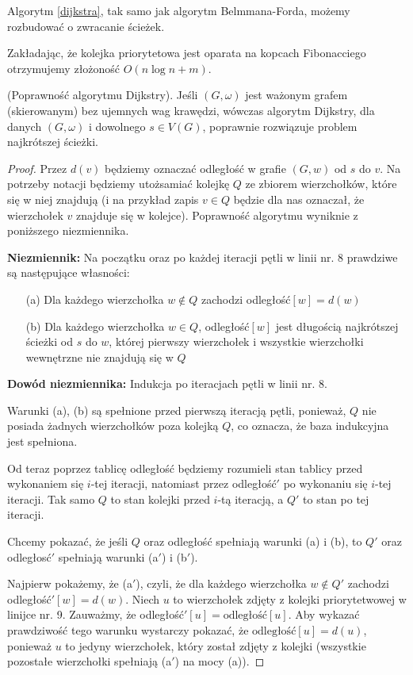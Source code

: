Algorytm \ref{dijkstra}, tak samo jak algorytm Belmmana-Forda,
możemy rozbudować o zwracanie ścieżek.

Zakładając, że kolejka priorytetowa jest oparata na kopcach 
Fibonacciego otrzymujemy złożoność $O(n\log n + m)$. 

\begin{theorem}{(Poprawność algorytmu Dijkstry).}
	Jeśli $(G, \omega)$ jest ważonym grafem (skierowanym)
	bez ujemnych wag krawędzi, wówczas algorytm Dijkstry,
	dla danych $(G, \omega)$ i dowolnego $s \in V(G)$, 
	poprawnie rozwiązuje problem najkrótszej ścieżki.
	
	\begin{proof}
		Przez $d(v)$ będziemy oznaczać odległość w 
		grafie $(G, w)$
		od $s$ do $v$. Na potrzeby notacji 
		będziemy utożsamiać
		kolejkę $Q$ ze zbiorem wierzchołków, które
		się w niej znajdują (i na przykład zapis $v \in Q$ 
		będzie dla nas oznaczał, że
		wierzchołek $v$ znajduje się w kolejce).
		Poprawność algorytmu wyniknie z poniższego niezmiennika.
		
		\textbf{Niezmiennik: } Na początku oraz po 
		każdej iteracji pętli w linii nr. 8 prawdziwe są 
		następujące własności:
		\begin{itemize}
			\item[(a)] Dla każdego wierzchołka $w \not \in Q$
			zachodzi odległość$[w] = d(w)$ 
			\item[(b)] Dla każdego wierzchołka $w \in Q$,
			odległość$[w]$ jest długością najkrótszej
			ścieżki od $s$ do $w$, której pierwszy wierzchołek 
			i wszystkie wierzchołki wewnętrzne nie znajdują się 
			w $Q$ 
		\end{itemize}
		\textbf{Dowód niezmiennika: } Indukcja po iteracjach
		pętli w linii nr. 8.
		
		Warunki (a), (b) są spełnione przed pierwszą iteracją
		pętli, ponieważ, $Q$
		nie posiada żadnych wierzchołków poza 
		kolejką $Q$, co oznacza, że baza indukcyjna jest spełniona.
		
		Od teraz poprzez tablicę odległość będziemy rozumieli 
		stan tablicy przed wykonaniem się $i$-tej iteracji, 
		natomiast przez odległość$'$ po wykonaniu się $i$-tej iteracji.
		Tak samo $Q$ to stan kolejki przed $i$-tą iteracją,
		a $Q'$ to stan po tej iteracji. 
		
		Chcemy pokazać, że jeśli $Q$ oraz odległość spełniają
		warunki (a) i (b), to $Q'$ oraz odległosć$'$ 
		spełniają warunki (a$'$) i (b$'$).
		
		Najpierw pokażemy, że (a$'$), czyli, że
		dla każdego wierzchołka $w \not \in Q'$ zachodzi
		odległość$'[w] = d(w)$. Niech $u$ to wierzchołek
		zdjęty z kolejki priorytetwowej w linijce nr. 9.
		Zauważmy, że odległość$'[u] = \text{odległość}[u]$. 
		Aby wykazać prawdziwość tego warunku wystarczy
		pokazać, że $\text{odległość}[u] = d(u)$, ponieważ
		$u$ to jedyny wierzchołek, który został zdjęty z kolejki
		(wszystkie pozostałe wierzchołki spełniają 
		(a$'$) na mocy (a)).
		

\end{proof}
\end{theorem}
